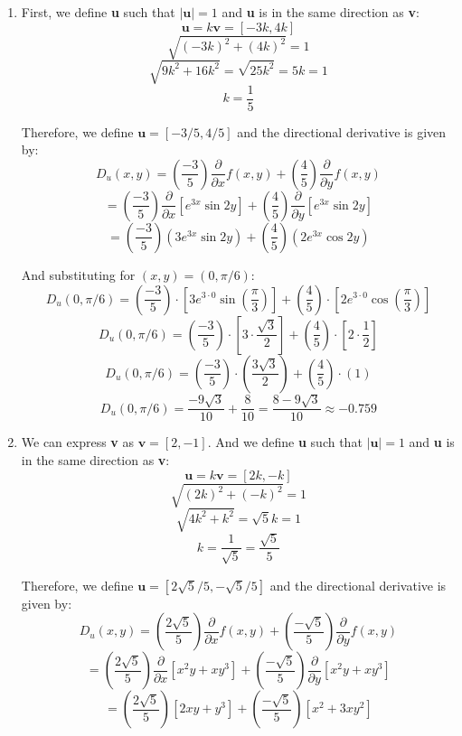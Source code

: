 \begin{Answer}[ref = direction]
\begin{enumerate}
    \item First, we define \textbf{u} such that $|\textbf{u}| = 1$ and 
    \textbf{u} is in the same direction as \textbf{v}:
    $$\textbf{u} = k \textbf{v} = \left[ -3k, 4k \right]$$
    $$\sqrt{ \left( -3k \right)^2 + \left( 4k \right)^2} = 1$$
    $$\sqrt{9k^2 + 16k^2} = \sqrt{25k^2} = 5k = 1$$
    $$k = \frac{1}{5}$$

    Therefore, we define $\textbf{u} = \left[ -3/5, 4/5 \right]$ and the 
    directional derivative is given by:
    $$D_u(x, y) = \left( \frac{-3}{5} \right) \frac{\partial}{\partial x} f(x, 
    y) + \left( \frac{4}{5} \right) \frac{\partial}{\partial y} f(x, y)$$
    $$= \left( \frac{-3}{5} \right) \frac{\partial}{\partial x} \left[ e^{3x} 
    \sin{2y} \right] + \left( \frac{4}{5} \right) \frac{\partial}{\partial y} 
    \left[ e^{3x} \sin{2y} \right]$$
    $$= \left( \frac{-3}{5} \right) \left( 3e^{3x} \sin{2y} \right) + \left( 
    \frac{4}{5} \right) \left( 2e^{3x} \cos{2y} \right)$$

    And substituting for $(x, y) = (0, \pi/6)$:
    $$D_u(0, \pi/6) = \left( \frac{-3}{5} \right) \cdot \left[ 3e^{3 \cdot 0} 
    \sin{ \left( \frac{\pi}{3} \right)} \right] + \left( \frac{4}{5} \right) 
    \cdot \left[ 2e^{3 \cdot 0} \cos{ \left( \frac{\pi}{3} \right)} \right]$$
    $$D_u(0, \pi/6) = \left( \frac{-3}{5} \right) \cdot \left[ 3 \cdot \frac{
    \sqrt{3}}{2} \right] + \left( \frac{4}{5} \right) \cdot \left[ 2 \cdot 
    \frac{1}{2} \right]$$
    $$D_u(0, \pi/6) = \left( \frac{-3}{5} \right) \cdot \left( \frac{3
    \sqrt{3}}{2} \right) + \left( \frac{4}{5} \right) \cdot \left( 1 \right)$$
    $$D_u(0, \pi/6) = \frac{-9\sqrt{3}}{10} + \frac{8}{10} = \frac{8-9\sqrt{3}
    }{10} \approx -0.759$$

    \item We can express \textbf{v} as $\textbf{v} = \left[ 2, -1 \right]$. 
    And we define \textbf{u} such that $| \textbf{u} | = 1$ and \textbf{u} is 
    in the same direction as \textbf{v}:
    $$\textbf{u} = k\textbf{v} = \left[ 2k, -k \right]$$
    $$\sqrt{\left( 2k \right)^2 + \left( -k \right)^2} = 1$$
    $$\sqrt{4k^2 + k^2} = \sqrt{5}k = 1$$
    $$k = \frac{1}{\sqrt{5}} = \frac{\sqrt{5}}{5}$$

    Therefore, we define $\textbf{u} = \left[ 2\sqrt{5}/5, -\sqrt{5}/5 \right]$
    and the directional derivative is given by:
    $$D_u(x, y) = \left( \frac{2\sqrt{5}}{5} \right) \frac{\partial}{\partial 
    x}f(x, y) + \left( \frac{-\sqrt{5}}{5} \right) \frac{\partial}{\partial y}
    f(x, y)$$
    $$= \left( \frac{2\sqrt{5}}{5} \right) \frac{\partial}{\partial x} \left[ 
    x^2y + xy^3 \right] + \left( \frac{-\sqrt{5}}{5} \right) \frac{\partial}{
    \partial y} \left[ x^2y + xy^3 \right]$$
    $$= \left( \frac{2\sqrt{5}}{5} \right) \left[ 2xy + y^3 \right] + \left( 
    \frac{-\sqrt{5}}{5} \right) \left[ x^2 + 3xy^2 \right]$$


\end{enumerate}
\end{Answer}
